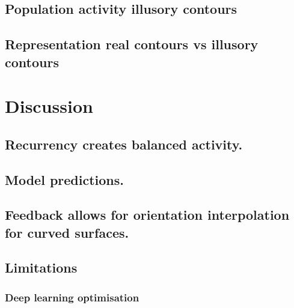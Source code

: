 \documentclass[12pt]{article}
\begin{document}
\subsection{Population activity illusory contours}

\subsection{Representation real contours vs illusory contours}

\newpage
\section{Discussion}

\subsection{Recurrency creates balanced activity.}

\subsection{Model predictions.}

\subsection{Feedback allows for orientation interpolation for curved surfaces.}

\subsection{Limitations}
\subsubsection{Deep learning optimisation}

\newpage
\printbibliography
\end{document}
